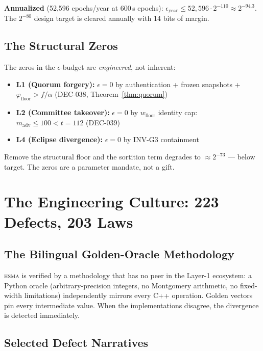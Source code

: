 \documentclass[11pt, a4paper]{article}
\newcommand{\hsma}{\textsc{hsma}}
\begin{document}
\textbf{Annualized} (52{,}596 epochs/year at 600\,s epochs): $\epsilon_{\text{year}} \le 52{,}596 \cdot 2^{-110} \approx 2^{-94.3}$. The $2^{-80}$ design target is cleared annually with 14 bits of margin.

\subsection{The Structural Zeros}

The zeros in the $\epsilon$-budget are \textit{engineered}, not inherent:

\begin{itemize}
\item \textbf{L1 (Quorum forgery):} $\epsilon = 0$ by authentication + frozen snapshots + $\varphi_{\text{floor}} > f/\alpha$ (DEC-038, Theorem~\ref{thm:quorum})
\item \textbf{L2 (Committee takeover):} $\epsilon = 0$ by $w_{\text{floor}}$ identity cap: $m_{\text{adv}} \le 100 < t = 112$ (DEC-039)
\item \textbf{L4 (Eclipse divergence):} $\epsilon = 0$ by INV-G3 containment
\end{itemize}

Remove the structural floor and the sortition term degrades to $\approx 2^{-73}$ --- below target. The zeros are a parameter mandate, not a gift.

\section{The Engineering Culture: 223 Defects, 203 Laws}

\subsection{The Bilingual Golden-Oracle Methodology}

\hsma{} is verified by a methodology that has no peer in the Layer-1 ecosystem: a Python oracle (arbitrary-precision integers, no Montgomery arithmetic, no fixed-width limitations) independently mirrors every C++ operation. Golden vectors pin every intermediate value. When the implementations disagree, the divergence is detected immediately.

\subsection{Selected Defect Narratives}
\end{document}
